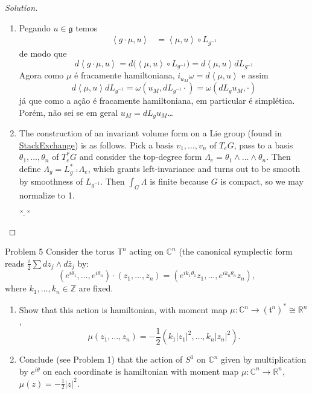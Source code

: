 \begin{proof}[Solution]\leavevmode
\begin{enumerate}[label=(\alph*)]
\item Pegando $u \in \mathfrak{g}$ temos
\begin{align*}
\left<g\cdot \mu,u\right>&=\left<\mu,u\right>\circ L_{g^{-1}}
\end{align*}
de modo que
\[d\left<g \cdot\mu,u\right>=d\Big(\left<\mu,u\right>\circ L_{g^{-1}}\Big)=d\left<\mu,u\right>dL_{g^{-1}}\]
Agora como $\mu$ é fracamente hamiltoniana, $i_{u_M}\omega=d\left<\mu,u\right>$ e assim
\[d\left<\mu,u\right>dL_{g^{-1}}=\omega(u_M,dL_{g^{-1}}\cdot)=\omega(dL_{g}u_M,\cdot)\]
já que como a ação é fracamente hamiltoniana, em particular é simplética. Porém, {\color{4}não sei} se em geral $u_M=dL_gu_M$…

\item The construction of an invariant volume form on a Lie group (found in \href{https://math.stackexchange.com/questions/3924697/existence-of-left-invariant-n-forms-in-a-lie-group}{StackExchange}) is as follows. Pick a basis $v_1,\ldots,v_n$ of $T_eG$, pass to a basis $\theta_1,\ldots,\theta_n$ of $T_e^*G$ and consider the top-degree form $\Lambda_e=\theta_1\wedge\ldots\wedge\theta_n$. Then define $\Lambda_g=L_{g^{-1}}^*\Lambda_e$, which grants left-invariance and turns out to be smooth by smoothness of $L_{g^{-1}}$. Then $\int_{G}\Lambda$ is finite because $G$ is compact, so we may normalize to 1.

{\color{7}$\overset{\times \;\times}{\widetilde{\;\;\;}}$}

\end{enumerate}
\end{proof}

\begin{thing1}{Problem 5}\leavevmode
Consider the torus $\mathbb{T}^n$ acting on $\mathbb{C}^{n}$ (the canonical symplectic form reads $\frac{i}{2}\sum dz_j\wedge d\bar{z}_j$ by:
\[\left( e^{i\theta_1},\ldots,e^{i\theta_n} \right) \cdot(z_1,\ldots,z_n)=\left( e^{ik_1\theta_1}z_1,\ldots,e^{ik_n\theta_n}z_n \right),\]
where $k_1,\ldots,k_n \in\mathbb{Z}$ are fixed.
\begin{enumerate}[label=(\alph*)]
\item Show that this action is hamiltonian, with moment map $\mu:\mathbb{C}^n\to(\mathfrak{t}^n)^*\cong \mathbb{R}^n$,
	\[\mu(z_1,\ldots,z_n)=-\frac{1}{2}\left( k_1|z_1|^2,\ldots,k_n|z_n|^2 \right) .\]
\item Conclude (see Problem 1) that the action of $S^1$ on $\mathbb{C}^n$ given by multiplication by $e^{i\theta}$ on each coordinate is hamiltonian with moment map $\mu:\mathbb{C}^n\to\mathbb{R}^n$, $\mu(z)=-\frac{1}{2}|z|^2$. 
\end{enumerate}
\end{thing1}

